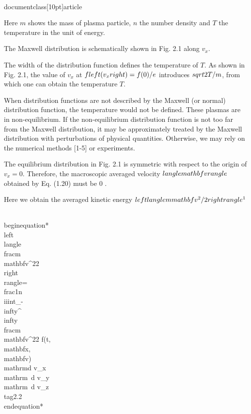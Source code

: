 \\documentclass[10pt]{article}
\begin{document}
Here $m$ shows the mass of plasma particle, $n$ the number density and $T$ the temperature in the unit of energy.

The Maxwell distribution is schematically shown in Fig. 2.1 along $v_{x}$.

The width of the distribution function defines the temperature of $T$. As shown in Fig. 2.1, the value of $v_{x}$ at $f\\left(v_{x}\\right)=f(0) / e$ introduces $\\sqrt{2 T / m}$, from which one can obtain the temperature $T$.

When distribution functions are not described by the Maxwell (or normal) distribution function, the temperature would not be defined. These plasmas are in non-equilibrium. If the non-equilibrium distribution function is not too far from the Maxwell distribution, it may be approximately treated by the Maxwell distribution with perturbations of physical quantities. Otherwise, we may rely on the numerical methods [1-5] or experiments.

The equilibrium distribution in Fig. 2.1 is symmetric with respect to the origin of $v_{x}=0$. Therefore, the macroscopic averaged velocity $\\langle\\mathbf{v}\\rangle$ obtained by Eq. (1.20) must be 0 .

Here we obtain the averaged kinetic energy $\\left\\langle m \\mathbf{v}^{2} / 2\\right\\rangle^{1}$


\\begin{equation*}
\\left\\langle\\frac{m \\mathbf{v}^{2}}{2}\\right\\rangle=\\frac{1}{n} \\iiint_{-\\infty}^{\\infty} \\frac{m \\mathbf{v}^{2}}{2} f(t, \\mathbf{x}, \\mathbf{v}) \\mathrm{d} v_{x} \\mathrm{~d} v_{y} \\mathrm{~d} v_{z} \\tag{2.2}
\\end{equation*}
\end{document}

